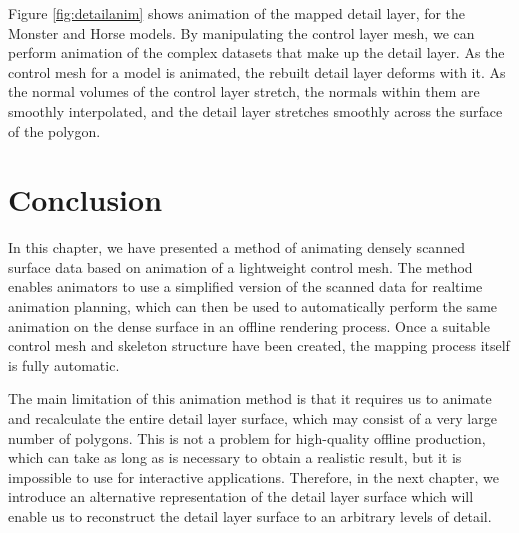 Figure \ref{fig:detailanim} shows animation of the mapped detail layer, for the Monster and Horse models. By manipulating the control layer mesh, we can perform animation of the complex datasets that make up the detail layer. As the control mesh for a model is animated, the rebuilt detail layer deforms with it. As the normal volumes of the control layer stretch, the normals within them are smoothly interpolated, and the detail layer stretches smoothly across the surface of the polygon.

\section{\label{sec:scandata:conclusion}Conclusion}

In this chapter, we have presented a method of animating densely scanned surface data based on animation of a lightweight control mesh. The method enables animators to use a simplified version of the scanned data for realtime animation planning, which can then be used to automatically perform the same animation on the dense surface in an offline rendering process. Once a suitable control mesh and skeleton structure have been created, the mapping process itself is fully automatic.

The main limitation of this animation method is that it requires us to animate and recalculate the entire detail layer surface, which may consist of a very large number of polygons. This is not a problem for high-quality offline production, which can take as long as is necessary to obtain a realistic result, but it is impossible to use for interactive applications. Therefore, in the next chapter, we introduce an alternative representation of the detail layer surface which will enable us to reconstruct the detail layer surface to an arbitrary levels of detail.

